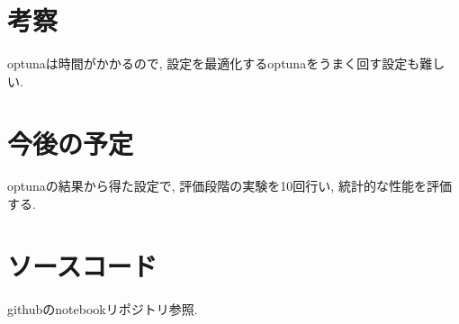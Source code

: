 \documentclass[twocolumn]{jarticle}     %
\begin{document}
\section{考察}
optunaは時間がかかるので, 設定を最適化するoptunaをうまく回す設定も難しい.

\section{今後の予定}
optunaの結果から得た設定で, 評価段階の実験を10回行い, 統計的な性能を評価する.

\section{ソースコード}
githubのnotebookリポジトリ参照.



\end{document}
